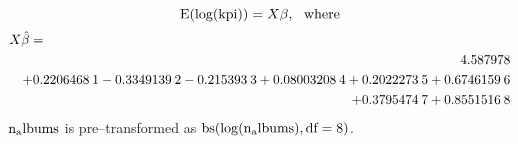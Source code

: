\[{\rm E({\rm log(kpi)}}) = X\beta, {\rm \ \ where} \\ \]
\begin{eqnarray*}
\lefteqn{X\hat{\beta}=}\\
& & 4.587978 \\
& &  +0.2206468 \:{\rm 1}-0.3349139\:{\rm 2}-0.215393 \:{\rm 3}+0.08003208\:{\rm 4}+0.2022273 \:{\rm 5}+0.6746159 \:{\rm 6} \\
& &  +0.3795474 \:{\rm 7}+0.8551516 \:{\rm 8} \\
\end{eqnarray*}
${\rm n_albums}$ is pre--transformed as ${\rm bs(\log(n_albums), df = 8)}$.
